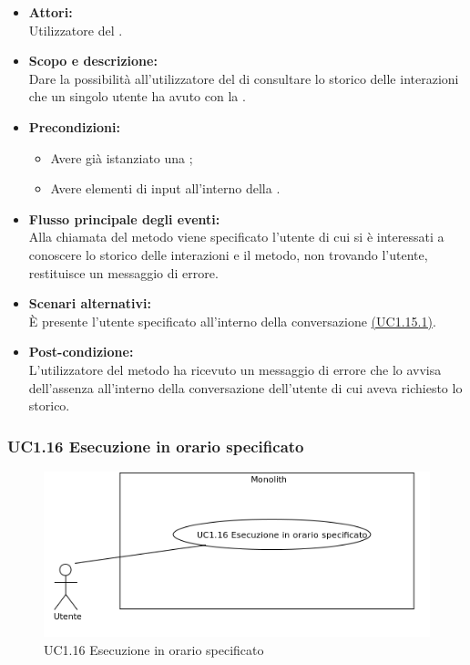 \begin{itemize}
	\item \textbf{Attori:}
	\\Utilizzatore del .
	\item \textbf{Scopo e descrizione:} 
	\\Dare la possibilità all'utilizzatore del  di consultare lo storico delle interazioni che un singolo utente ha avuto con la .
	\item \textbf{Precondizioni:}
	\begin{itemize}
		\item Avere già istanziato una ;
		\item Avere elementi di input all'interno della .
	\end{itemize}
	\item \textbf{Flusso principale degli eventi:}
	\\Alla chiamata del metodo viene specificato l'utente di cui si è interessati a conoscere lo storico delle interazioni e il metodo, non trovando l'utente, restituisce un messaggio di errore.
	\item \textbf{Scenari alternativi:}
	\\È presente l'utente specificato all'interno della conversazione \hyperref[UC1.15.1]{(UC1.15.1)}.
	\item \textbf{Post-condizione:}
	\\L'utilizzatore del metodo ha ricevuto un messaggio di errore che lo avvisa dell'assenza all'interno della conversazione dell'utente di cui aveva richiesto lo storico.
\end{itemize}

\subsubsection{UC1.16 Esecuzione in orario specificato} \label{UC1.16}

\begin{figure}[H]
	\centering
	\includegraphics[width=15cm]{../../documenti/AnalisiDeiRequisiti/Diagrammi_img/uc1_16.png}
	\caption{UC1.16 Esecuzione in orario specificato}
\end{figure}

